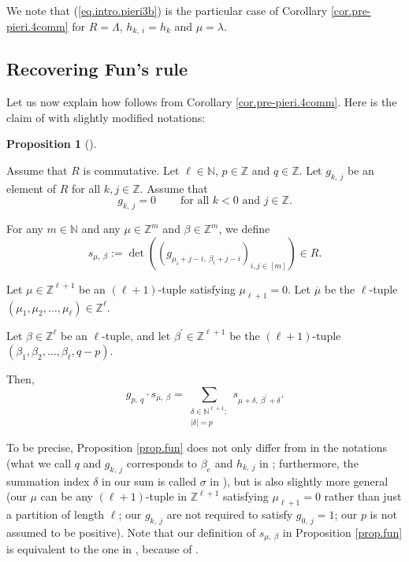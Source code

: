 \documentclass[numbers=enddot,12pt,final,onecolumn,notitlepage,english]{scrartcl}%
\theoremstyle{definition}
\newtheorem{prop}[theo]{Proposition}
\newenvironment{proposition}[1][]
{\begin{prop}[#1]\begin{leftbar}}
{\end{leftbar}\end{prop}}
\let\sumnonlimits\sum
\renewcommand{\sum}{\sumnonlimits\limits}
\begin{document}
We note that (\ref{eq.intro.pieri3b}) is the particular case of Corollary
\ref{cor.pre-pieri.4comm} for $R=\Lambda$, $h_{k,\ i}=h_{k}$ and $\mu=\lambda$.

\subsection{Recovering Fun's rule}

Let us now explain how \cite[Proposition 3.9]{Fun} follows from Corollary
\ref{cor.pre-pieri.4comm}. Here is the claim of \cite[Proposition 3.9]{Fun}
with slightly modified notations:

\begin{proposition}
\label{prop.fun}Assume that $R$ is commutative. Let $\ell\in\mathbb{N}$,
$p\in\mathbb{Z}$ and $q\in\mathbb{Z}$. Let $g_{k,\ j}$ be an element of $R$
for all $k,j\in\mathbb{Z}$. Assume that%
\begin{equation}
g_{k,\ j}=0\ \ \ \ \ \ \ \ \ \ \text{for all }k<0\text{ and }j\in\mathbb{Z}.
\label{eq.prop.fun.ass=0}%
\end{equation}


For any $m\in\mathbb{N}$ and any $\mu\in\mathbb{Z}^{m}$ and $\beta
\in\mathbb{Z}^{m}$, we define%
\[
s_{\mu,\ \beta}:=\det\left(  \left(  g_{\mu_{i}+j-i,\ \beta_{i}+j-i}\right)
_{i,j\in\left[  m\right]  }\right)  \in R.
\]


Let $\mu\in\mathbb{Z}^{\ell+1}$ be an $\left(  \ell+1\right)  $-tuple
satisfying $\mu_{\ell+1}=0$. Let $\overline{\mu}$ be the $\ell$-tuple $\left(
\mu_{1},\mu_{2},\ldots,\mu_{\ell}\right)  \in\mathbb{Z}^{\ell}$.

Let $\beta\in\mathbb{Z}^{\ell}$ be an $\ell$-tuple, and let $\beta^{\prime}%
\in\mathbb{Z}^{\ell+1}$ be the $\left(  \ell+1\right)  $-tuple $\left(
\beta_{1},\beta_{2},\ldots,\beta_{\ell},q-p\right)  $.

Then,%
\[
g_{p,\ q}\cdot s_{\overline{\mu},\ \beta}=\sum_{\substack{\delta\in
\mathbb{N}^{\ell+1};\\\left\vert \delta\right\vert =p}}s_{\mu+\delta
,\ \beta^{\prime}+\delta}.
\]

\end{proposition}

To be precise, Proposition \ref{prop.fun} does not only differ from
\cite[Proposition 3.9]{Fun} in the notations (what we call $q$ and $g_{k,\ j}$
corresponds to $\beta_{e}$ and $h_{k,\ j}$ in \cite[Proposition 3.9]{Fun};
furthermore, the summation index $\delta$ in our sum is called $\sigma$ in
\cite[Proposition 3.9]{Fun}), but is also slightly more general (our $\mu$ can
be any $\left(  \ell+1\right)  $-tuple in $\mathbb{Z}^{\ell+1}$ satisfying
$\mu_{\ell+1}=0$ rather than just a partition of length $\ell$; our
$g_{k,\ j}$ are not required to satisfy $g_{0,\ j}=1$; our $p$ is not assumed
to be positive). Note that our definition of $s_{\mu,\ \beta}$ in Proposition
\ref{prop.fun} is equivalent to the one in \cite{Fun}, because of
\cite[(3.3)]{Fun}.
\end{document}
